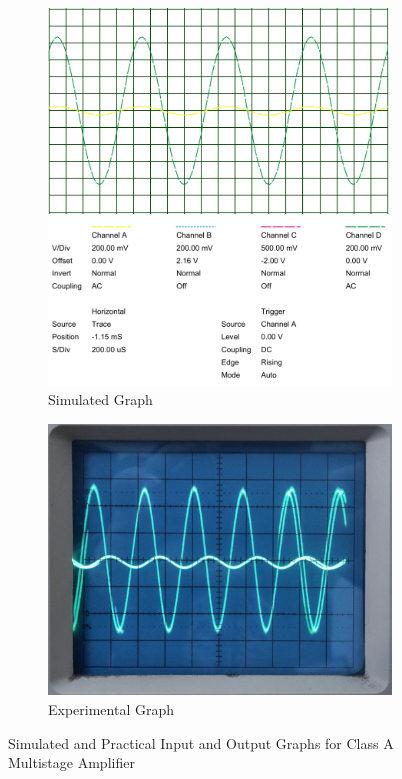 \documentclass[12pt]{article}
\begin{document}
\begin{figure}[h!]
    \centering
    \begin{subfigure}{0.45\textwidth}
        \includegraphics[width=\textwidth]{Simulated_graph.png}
        \caption{Simulated Graph}
    \end{subfigure}
    \begin{subfigure}{0.45\textwidth}
        \includegraphics[width=\textwidth]{Practical_graph.jpg}
        \caption{Experimental Graph}
    \end{subfigure}
    \caption{Simulated and Practical Input and Output Graphs for Class A Multistage Amplifier}
\end{figure}
\end{document}
